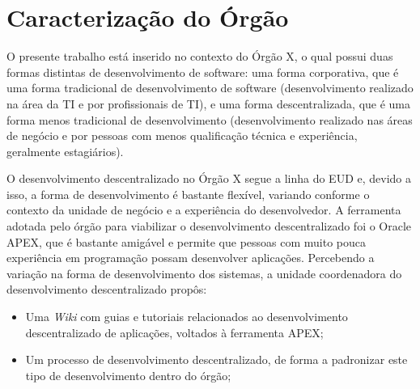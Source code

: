 \section{Caracterização do Órgão}

O presente trabalho está inserido no contexto do Órgão X, o qual possui duas formas distintas de desenvolvimento de software: uma forma corporativa, que é uma forma tradicional de desenvolvimento de software (desenvolvimento realizado na área da TI e por profissionais de TI), e uma forma descentralizada, que é uma forma menos tradicional de desenvolvimento (desenvolvimento realizado nas áreas de negócio e por pessoas com menos qualificação técnica e experiência, geralmente estagiários).

O desenvolvimento descentralizado no Órgão X segue a linha do EUD e, devido a isso, a forma de desenvolvimento é bastante flexível, variando conforme o contexto da unidade de negócio e a experiência do desenvolvedor. A ferramenta adotada pelo órgão para viabilizar o desenvolvimento descentralizado foi o Oracle APEX, que é bastante amigável e permite que pessoas com muito pouca experiência em programação possam desenvolver aplicações. Percebendo a variação na forma de desenvolvimento dos sistemas, a unidade coordenadora do desenvolvimento descentralizado propôs:

\begin{itemize}
\item Uma \textit{Wiki} com guias e tutoriais relacionados ao desenvolvimento descentralizado de aplicações, voltados à ferramenta APEX;
\item Um processo de desenvolvimento descentralizado, de forma a padronizar este tipo de desenvolvimento dentro do órgão;
\end{itemize}

